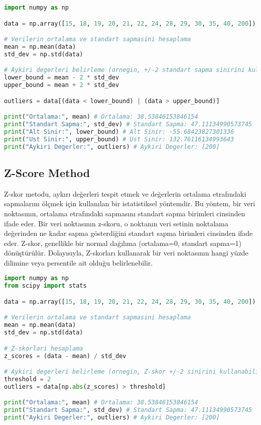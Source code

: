 \begin{lstlisting}[language=Python]
import numpy as np

data = np.array([15, 18, 19, 20, 21, 22, 24, 28, 29, 30, 35, 40, 200])

# Verilerin ortalama ve standart sapmasini hesaplama
mean = np.mean(data)
std_dev = np.std(data)

# Aykiri degerleri belirleme (ornegin, +/-2 standart sapma sinirini kullanabiliriz)
lower_bound = mean - 2 * std_dev
upper_bound = mean + 2 * std_dev

outliers = data[(data < lower_bound) | (data > upper_bound)]

print("Ortalama:", mean) # Ortalama: 38.53846153846154
print("Standart Sapma:", std_dev) # Standart Sapma: 47.11134990573745
print("Alt Sinir:", lower_bound) # Alt Sinir: -55.68423827301336
print("Ust Sinir:", upper_bound) # Ust Sinir: 132.76116134993643
print("Aykiri Degerler:", outliers) # Aykiri Degerler: [200]
\end{lstlisting}

\subsection{Z-Score Method}
Z-skor metodu, aykırı değerleri tespit etmek ve değerlerin ortalama etrafındaki sapmalarını ölçmek için kullanılan bir istatistiksel yöntemdir. Bu yöntem, bir veri noktasının, ortalama etrafındaki sapmasını standart sapma birimleri cinsinden ifade eder. Bir veri noktasının z-skoru, o noktanın veri setinin noktalama değerinden ne kadar sapma gösterdiğini standart sapma birimleri cinsinden ifade eder. Z-skor, genellikle bir normal dağılıma (ortalama=0, standart sapma=1) dönüştürülür. Dolayısıyla, Z-skorları kullanarak bir veri noktasının hangi yüzde dilimine veya persentile ait olduğu belirlenebilir.

\begin{lstlisting}[language=Python]
import numpy as np
from scipy import stats

data = np.array([15, 18, 19, 20, 21, 22, 24, 28, 29, 30, 35, 40, 200])

# Verilerin ortalama ve standart sapmasini hesaplama
mean = np.mean(data)
std_dev = np.std(data)

# Z-skorlari hesaplama
z_scores = (data - mean) / std_dev

# Aykiri degerleri belirleme (ornegin, Z-skor +/-2 sinirini kullanabiliriz)
threshold = 2
outliers = data[np.abs(z_scores) > threshold]

print("Ortalama:", mean) # Ortalama: 38.53846153846154
print("Standart Sapma:", std_dev) # Standart Sapma: 47.11134990573745
print("Aykiri Degerler:", outliers) # Aykiri Degerler: [200]
\end{lstlisting}

